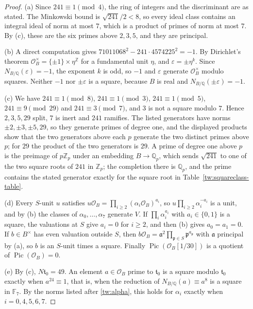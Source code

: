 \documentclass[11pt]{amsart}
\numberwithin{equation}{section}
\theoremstyle{definition}
\theoremstyle{remark}
\DeclareMathOperator{\Pic}{Pic}
\newcommand{\Q}{\mathbb Q}
\newcommand{\Z}{\mathbb Z}
\begin{document}
\begin{proof}
(a) Since $241\equiv1\pmod 4$, the ring of integers and the discriminant are
as stated. The Minkowski bound is $\sqrt{241}/2<8$, so every ideal class
contains an integral ideal of norm at most $7$, which is a product of primes
of norm at most $7$. By (c), these are the six primes above $2,3,5$, and they
are principal.

(b) A direct computation gives $71011068^2-241\cdot4574225^2=-1$. By
Dirichlet's theorem $\mathcal O_B^\times=\{\pm1\}\times\eta^{\Z}$ for a
fundamental unit $\eta$, and $\varepsilon=\pm\eta^k$. Since
$N_{B/\Q}(\varepsilon)=-1$, the exponent $k$ is odd, so $-1$ and
$\varepsilon$ generate $\mathcal O_B^\times$ modulo squares. Neither $-1$ nor
$\pm\varepsilon$ is a square, because $B$ is real and
$N_{B/\Q}(\pm\varepsilon)=-1$.

(c) We have $241\equiv1\pmod8$, $241\equiv1\pmod3$, $241\equiv1\pmod5$,
$241\equiv9\pmod{29}$ and $241\equiv3\pmod7$, and $3$ is not a square modulo
$7$. Hence $2,3,5,29$ split, $7$ is inert and $241$ ramifies. The listed
generators have norms $\pm2,\pm3,\pm5,29$, so they generate primes of degree
one, and the displayed products show that the two generators above each $p$
generate the two distinct primes above $p$; for $29$ the product of the two
generators is $29$. A prime of degree one above $p$ is the preimage of
$p\Z_p$ under an embedding $B\to\Q_p$, which sends $\sqrt{241}$ to one of
the two square roots of $241$ in $\Z_p$; the completion there is $\Q_p$, and
the prime contains the stated generator exactly for the square root in
Table~\ref{tw:squareclass-table}.

(d) Every $S$-unit $u$ satisfies
$u\mathcal O_B=\prod_{i\ge2}(\alpha_i\mathcal O_B)^{a_i}$, so
$u\prod_{i\ge2}\alpha_i^{-a_i}$ is a unit, and by (b) the classes of
$\alpha_0,\dots,\alpha_7$ generate $V$. If $\prod_i\alpha_i^{a_i}$ with
$a_i\in\{0,1\}$ is a square, the valuations at $S$ give $a_i=0$ for $i\ge2$,
and then (b) gives $a_0=a_1=0$. If $b\in B^\times$ has even valuation outside
$S$, then
$b\mathcal O_B=\mathfrak a^2\prod_{\mathfrak p\in S}\mathfrak p^{a_{\mathfrak p}}$
with $\mathfrak a$ principal by (a), so $b$ is an $S$-unit times a square.
Finally $\Pic(\mathcal O_B[1/30])$ is a quotient of $\Pic(\mathcal O_B)=0$.

(e) By (c), $N\mathfrak t_0=49$. An element $a\in\mathcal O_B$ prime to
$\mathfrak t_0$ is a square modulo $\mathfrak t_0$ exactly when
$a^{24}\equiv1$, that is, when the reduction of $N_{B/\Q}(a)\equiv a^8$ is a
square in $\mathbb F_7$. By the norms listed after \eqref{tw:alpha}, this
holds for $\alpha_i$ exactly when $i=0,4,5,6,7$.
\end{proof}
\end{document}
